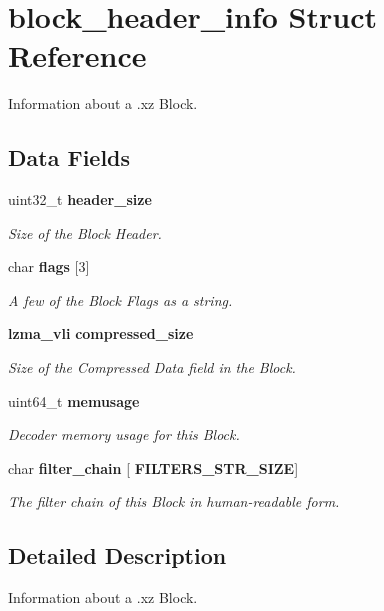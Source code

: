 \section{block\+\_\+header\+\_\+info Struct Reference}
\label{structblock__header__info}


Information about a .xz Block.  


\subsection*{Data Fields}
\begin{DoxyCompactItemize}
\item 
uint32\+\_\+t \textbf{ header\+\_\+size}
\begin{DoxyCompactList}\small\item\em Size of the Block Header. \end{DoxyCompactList}\item 
char \textbf{ flags} [3]
\begin{DoxyCompactList}\small\item\em A few of the Block Flags as a string. \end{DoxyCompactList}\item 
\textbf{ lzma\+\_\+vli} \textbf{ compressed\+\_\+size}
\begin{DoxyCompactList}\small\item\em Size of the Compressed Data field in the Block. \end{DoxyCompactList}\item 
uint64\+\_\+t \textbf{ memusage}
\begin{DoxyCompactList}\small\item\em Decoder memory usage for this Block. \end{DoxyCompactList}\item 
char \textbf{ filter\+\_\+chain} [\textbf{ F\+I\+L\+T\+E\+R\+S\+\_\+\+S\+T\+R\+\_\+\+S\+I\+ZE}]
\begin{DoxyCompactList}\small\item\em The filter chain of this Block in human-\/readable form. \end{DoxyCompactList}\end{DoxyCompactItemize}


\subsection{Detailed Description}
Information about a .xz Block. 

